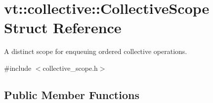 \hypertarget{structvt_1_1collective_1_1_collective_scope}{}\section{vt\+:\+:collective\+:\+:Collective\+Scope Struct Reference}
\label{structvt_1_1collective_1_1_collective_scope}


A distinct scope for enqueuing ordered collective operations.  




{\ttfamily \#include $<$collective\+\_\+scope.\+h$>$}

\subsection*{Public Member Functions}
